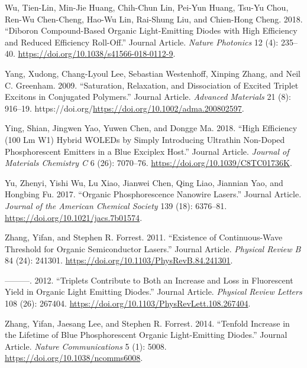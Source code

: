 \documentclass[
  letterpaper,
  DIV=11,
  numbers=noendperiod,
  oneside]{scrreprt}
\newlength{\cslhangindent}
\newlength{\cslentryspacingunit} %
\newenvironment{CSLReferences}[2] %
 {%
  \setlength{\parindent}{0pt}
  \ifodd #1
  \let\oldpar\par
  \def\par{\hangindent=\cslhangindent\oldpar}
  \fi
  \setlength{\parskip}{#2\cslentryspacingunit}
 }%
 {}
\begin{document}
\begin{CSLReferences}{1}{0}
\leavevmode{}%
Wu, Tien-Lin, Min-Jie Huang, Chih-Chun Lin, Pei-Yun Huang, Tsu-Yu Chou,
Ren-Wu Chen-Cheng, Hao-Wu Lin, Rai-Shung Liu, and Chien-Hong Cheng.
2018. {``Diboron Compound-Based Organic Light-Emitting Diodes with High
Efficiency and Reduced Efficiency Roll-Off.''} Journal Article.
\emph{Nature Photonics} 12 (4): 235--40.
\url{https://doi.org/10.1038/s41566-018-0112-9}.

\leavevmode{}%
Yang, Xudong, Chang-Lyoul Lee, Sebastian Westenhoff, Xinping Zhang, and
Neil C. Greenham. 2009. {``Saturation, Relaxation, and Dissociation of
Excited Triplet Excitons in Conjugated Polymers.''} Journal Article.
\emph{Advanced Materials} 21 (8): 916--19.
https://doi.org/\url{https://doi.org/10.1002/adma.200802597}.

\leavevmode{}%
Ying, Shian, Jingwen Yao, Yuwen Chen, and Dongge Ma. 2018. {``High
Efficiency (100 Lm W1) Hybrid WOLEDs by Simply Introducing Ultrathin
Non-Doped Phosphorescent Emitters in a Blue Exciplex Host.''} Journal
Article. \emph{Journal of Materials Chemistry C} 6 (26): 7070--76.
\url{https://doi.org/10.1039/C8TC01736K}.

\leavevmode{}%
Yu, Zhenyi, Yishi Wu, Lu Xiao, Jianwei Chen, Qing Liao, Jiannian Yao,
and Hongbing Fu. 2017. {``Organic Phosphorescence Nanowire Lasers.''}
Journal Article. \emph{Journal of the American Chemical Society} 139
(18): 6376--81. \url{https://doi.org/10.1021/jacs.7b01574}.

\leavevmode{}%
Zhang, Yifan, and Stephen R. Forrest. 2011. {``Existence of
Continuous-Wave Threshold for Organic Semiconductor Lasers.''} Journal
Article. \emph{Physical Review B} 84 (24): 241301.
\url{https://doi.org/10.1103/PhysRevB.84.241301}.

\leavevmode{}%
---------. 2012. {``Triplets Contribute to Both an Increase and Loss in
Fluorescent Yield in Organic Light Emitting Diodes.''} Journal Article.
\emph{Physical Review Letters} 108 (26): 267404.
\url{https://doi.org/10.1103/PhysRevLett.108.267404}.

\leavevmode{}%
Zhang, Yifan, Jaesang Lee, and Stephen R. Forrest. 2014. {``Tenfold
Increase in the Lifetime of Blue Phosphorescent Organic Light-Emitting
Diodes.''} Journal Article. \emph{Nature Communications} 5 (1): 5008.
\url{https://doi.org/10.1038/ncomms6008}.


\end{CSLReferences}
\end{document}
